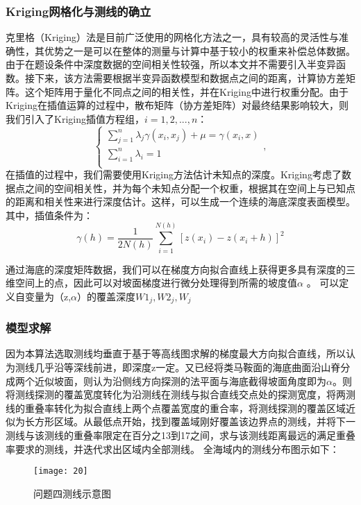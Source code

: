 \documentclass[withoutpreface,bwprint]{cumcmthesis} %
\begin{document}
\subsubsection{Kriging网格化与测线的确立}
克里格（Kriging）法是目前广泛使用的网格化方法之一，具有较高的灵活性与准确性，其优势之一是可以在整体的测量与计算中基于较小的权重来补偿总体数据。由于在题设条件中深度数据的空间相关性较强，所以本文并不需要引入半变异函数。接下来，该方法需要根据半变异函数模型和数据点之间的距离，计算协方差矩阵。这个矩阵用于量化不同点之间的相关性，并在Kriging中进行权重分配。由于Kriging在插值运算的过程中，散布矩阵（协方差矩阵）对最终结果影响较大，则我们引入了Kriging插值方程组，$i=1,2,...,n$：
\begin{equation}
\left\{
\begin{aligned}
\sum_{j=1}^{n}{\lambda_j\gamma(x_i,x_j)+\mu=\gamma(x_i,x)}\\
\sum_{i=1}^{n}{\lambda_i}=1\\
\end{aligned}
\right.
,
\end{equation}
在插值的过程中，我们需要使用Kriging方法估计未知点的深度。Kriging考虑了数据点之间的空间相关性，并为每个未知点分配一个权重，根据其在空间上与已知点的距离和相关性来进行深度估计。这样，可以生成一个连续的海底深度表面模型。其中，插值条件为：
\begin{equation}
\gamma(h)=\frac{1}{2N(h)}\sum_{i=1}^{N(h)}{[z(x_i)-z(x_i+h)]^2}
\end{equation}


通过海底的深度矩阵数据，我们可以在梯度方向拟合直线上获得更多具有深度的三维空间上的点，因此可以对坡面梯度进行微分处理得到所需的坡度值$\alpha$ 。
可以定义自变量为（z,$\alpha$）的覆盖深度$W1_j,W2_j,W_j$

\subsubsection{模型求解}
因为本算法选取测线均垂直于基于等高线图求解的梯度最大方向拟合直线，所以认为测线几乎沿等深线前进，即深度z一定。又已经将类马鞍面的海底曲面沿山脊分成两个近似坡面，则认为沿侧线方向探测的法平面与海底截得坡面角度即为$\alpha$。则将测线探测的覆盖宽度转化为沿测线在测线与拟合直线交点处的探测宽度，将两测线的重叠率转化为拟合直线上两个点覆盖宽度的重合率，将测线探测的覆盖区域近似为长方形区域。从最低点开始，找到覆盖域刚好覆盖该边界点的测线，并将下一测线与该测线的重叠率限定在百分之13到17之间，求与该测线距离最远的满足重叠率要求的测线，并迭代求出区域内全部测线。
全海域内的测线分布图示如下：

\begin{figure}[H]
    \centering
    \texttt{[image: 20]}
    \caption{问题四测线示意图}
    \label{fig:four}
\end{figure}
\end{document}
